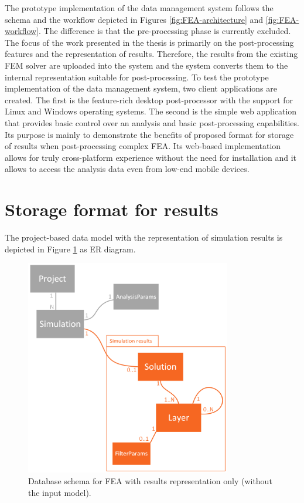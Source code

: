 The prototype implementation of the data management system follows the schema and the workflow depicted in Figures \ref{fig:FEA-architecture} and \ref{fig:FEA-workflow}. The difference is that the pre-processing phase is currently excluded. The focus of the work presented in the thesis is primarily on the post-processing features and the representation of results. Therefore, the results from the existing FEM solver are uploaded into the system and the system converts them to the internal representation suitable for post-processing. To test the prototype implementation of the data management system, two client applications are created. The first is the feature-rich desktop post-processor with the support for Linux and Windows operating systems. The second is the simple web application that provides basic control over an analysis and basic post-processing capabilities. Its purpose is mainly to demonstrate the benefits of proposed format for storage of results when post-processing complex FEA. Its web-based implementation allows for truly cross-platform experience without the need for installation and it allows to access the analysis data even from low-end mobile devices.


\section{Storage format for results}
\label{sec:storage-format}

The project-based data model with the representation of simulation results is depicted in Figure \ref{fig:FEA-db-schema-results} as ER diagram.

\begin{figure}[H]
    \centering
    \includegraphics[width=0.8\textwidth]{figures/chapter-data-management/FEA-database-schema-only-results}
    \decoRule
    \caption[Database schema for FEA with results representation only.]{Database schema for FEA with results representation only (without the input model).}
    \label{fig:FEA-db-schema-results}
\end{figure}

